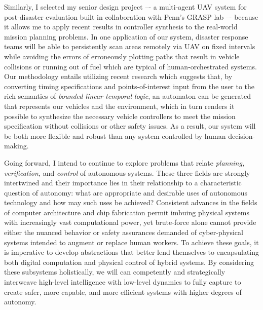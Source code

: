 \documentclass[11pt]{letter}
\begin{document}
Similarly, I selected my senior design project –- a multi-agent UAV system for post-disaster evaluation built in collaboration with Penn's GRASP lab –- because it allows me to apply recent results in controller synthesis to the real-world mission planning problems.  In one application of our system, disaster response teams will be able to persistently scan areas remotely via UAV on fixed intervals while avoiding the errors of erroneously plotting paths that result in vehicle collisions or running out of fuel which are typical of human-orchestrated systems. Our methodology entails utilizing recent research which suggests that, by converting timing specifications and points-of-interest input from the user to the rich semantics of \emph{bounded linear temporal logic}, an automaton can be generated that represents our vehicles and the environment, which in turn renders it possible to synthesize the necessary vehicle controllers to meet the mission specification without collisions or other safety issues.  As a result, our system will be both more flexible and robust than any system controlled by human decision-making.

Going forward, I intend to continue to explore problems that relate \emph{planning, verification,} and \emph{control} of autonomous systems.  These three fields are strongly intertwined and their importance lies in their relationship to a characteristic question of autonomy:  what are appropriate and desirable uses of autonomous technology and how may such uses be achieved? Consistent advances in the fields of computer architecture and chip fabrication permit imbuing physical systems with increasingly vast computational power, yet brute-force alone cannot provide either the nuanced behavior or safety assurances demanded of cyber-physical systems intended to augment or replace human workers. To achieve these goals, it is imperative to develop abstractions that better lend themselves to encapsulating both digital computation and physical control of hybrid systems. By considering these subsystems holistically, we will can competently and strategically interweave high-level intelligence with low-level dynamics to fully capture to create safer, more capable, and more efficient systems with higher degrees of autonomy.  
\end{document}
